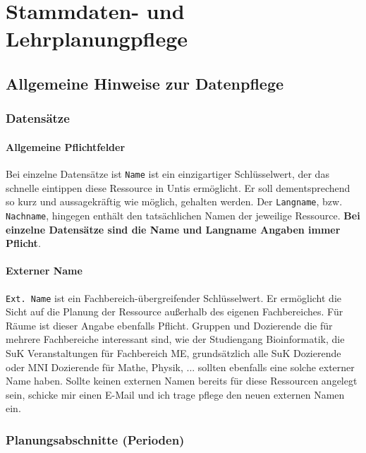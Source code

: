 
\chapter{Stammdaten- und Lehrplanungpflege}
\label{chap:data}

\section{Allgemeine Hinweise zur Datenpflege}

\subsection{Datensätze}

\subsubsection{Allgemeine Pflichtfelder}

Bei einzelne Datensätze ist \texttt{Name} ist ein einzigartiger Schlüsselwert, der das schnelle eintippen diese Ressource in Untis ermöglicht. Er soll dementsprechend so kurz und aussagekräftig wie möglich, gehalten werden. Der \texttt{Langname}, bzw. \texttt{Nachname}, hingegen enthält den tatsächlichen Namen der jeweilige Ressource. \textbf{Bei einzelne Datensätze sind die Name und Langname Angaben immer Pflicht}.

\subsubsection{Externer Name}
\label{sec:ext-name}

\texttt{Ext. Name} ist ein Fachbereich-übergreifender Schlüsselwert. Er ermöglicht die Sicht auf die Planung der Ressource außerhalb des eigenen Fachbereiches. Für Räume ist dieser Angabe ebenfalls Pflicht. Gruppen und Dozierende die für mehrere Fachbereiche interessant sind, wie der Studiengang Bioinformatik, die SuK Veranstaltungen für Fachbereich ME, grundsätzlich alle SuK Dozierende oder MNI Dozierende für Mathe, Physik, ... sollten ebenfalls eine solche externer Name haben. Sollte keinen externen Namen bereits für diese Ressourcen angelegt sein, schicke mir einen E-Mail und ich trage pflege den neuen externen Namen ein.


\subsection{Planungsabschnitte (Perioden)}

